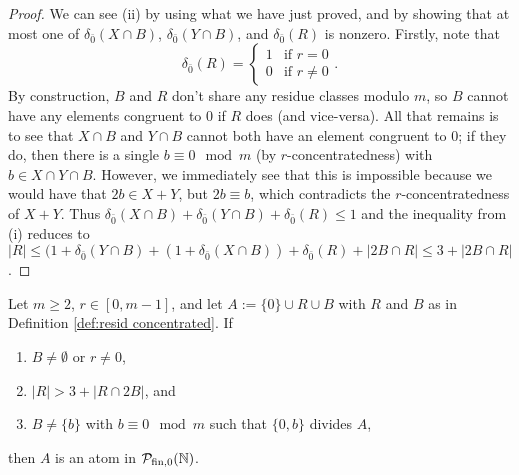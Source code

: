 \begin{proof}
We can see (ii) by using what we have just proved, and by showing that at most one of $\delta_{\bar{0}}(X\cap B)$, $\delta_{\bar{0}}(Y\cap B)$, and $\delta_{\bar{0}}(R)$ is nonzero.
Firstly, note that
\[\delta_{\bar{0}}(R) = \begin{cases}
1 & \textrm{if } r = 0 \\
0 & \textrm{if } r\neq 0
\end{cases}.\]
By construction, $B$ and $R$ don't share any residue classes modulo $m$, so $B$ cannot have any elements congruent to $0$ if $R$ does (and vice-versa).  
All that remains is to see that $X\cap B$ and $Y\cap B$ cannot both have an element congruent to $0$; if they do, then there is a single $b \equiv 0 \mod m$ (by $r$-concentratedness) with $b\in X\cap Y \cap B$.
However, we immediately see that this is impossible because we would have that $2b \in X+Y$, but $2b \equiv b$, which contradicts the $r$-concentratedness of $X+Y$.
Thus $\delta_{\bar{0}}(X\cap B) + \delta_{\bar{0}}(Y\cap B) + \delta_{\bar{0}}(R) \le 1$ and the inequality from (i) reduces to $|R| \le (1+\delta_{\bar{0}}(Y\cap B)+ (1+\delta_{\bar{0}}(X\cap B)) + \delta_{\bar{0}}(R) + |2B\cap R| \le 3 + |2B \cap R|$.
\end{proof}

\begin{prop} \label{prop:resid concentrated atoms}
Let $m\ge 2$, $r\in [0,m-1]$, and let $A := \{0\}\cup R \cup B$ with $R$ and $B$ as in Definition \ref{def:resid concentrated}.
If 
\begin{enumerate}[label={\rm (\arabic{*})}]
	\item $B\neq \emptyset$ or $r\neq 0$,
	\item $|R| > 3 + |R\cap 2B|$, and
	\item $B \neq \{b\}$ with $b\equiv 0 \mod m$ such that $\{0,b\}$ divides $A$,
\end{enumerate}
then $A$ is an atom in ${\mathcal{P}_{\textrm{fin},0}(\mathbb{N})}$.
\end{prop}

